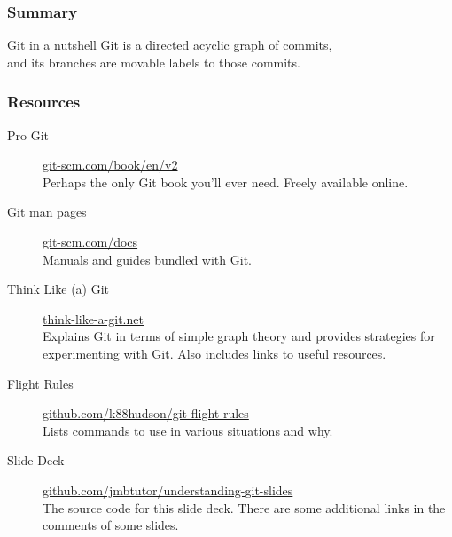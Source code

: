 \documentclass{beamer}
\begin{document}
\begin{frame}
  \frametitle{Summary}
  \begin{block}{Git in a nutshell}
    Git is a directed acyclic graph of commits,\\
    and its branches are movable labels to those commits.
  \end{block}
\end{frame}

\begin{frame}
  \frametitle{Resources}
  \begin{description}
    \item[Pro Git] \href{https://git-scm.com/book/en/v2}{git-scm.com/book/en/v2}\\
      Perhaps the only Git book you'll ever need. Freely available online.
    \item[Git man pages] \href{https://git-scm.com/docs}{git-scm.com/docs}\\
      Manuals and guides bundled with Git.
    \item[Think Like (a) Git] \href{http://think-like-a-git.net}{think-like-a-git.net}\\
      Explains Git in terms of simple graph theory and provides strategies for experimenting with Git. Also includes links to useful resources.
    \item[Flight Rules] \href{https://github.com/k88hudson/git-flight-rules}{github.com/k88hudson/git-flight-rules}\\
      Lists commands to use in various situations and why. %
    \item[Slide Deck] \href{https://github.com/jmbtutor/understanding-git-slides}{github.com/jmbtutor/understanding-git-slides}\\
      The source code for this slide deck. There are some additional links in the comments of some slides.
  \end{description}
\end{frame}
\end{document}

